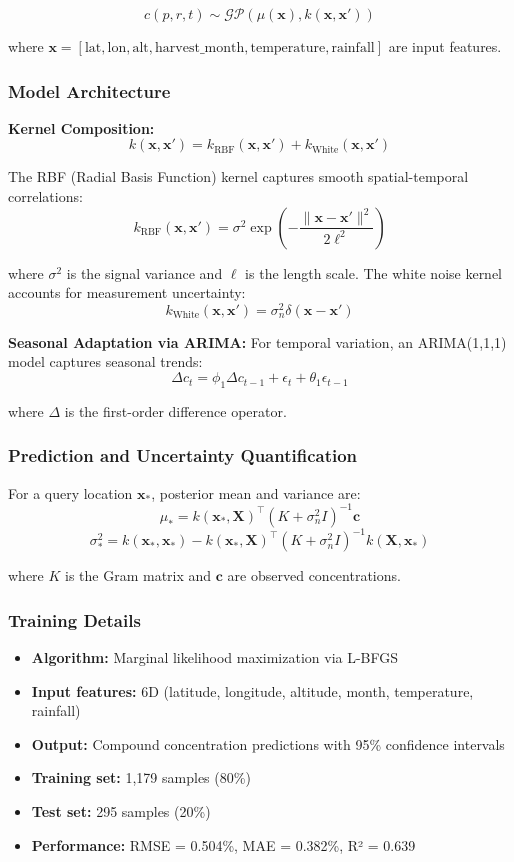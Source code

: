 \documentclass[11pt,a4paper]{article}
\begin{document}
\[
c(p, r, t) \sim \mathcal{GP}(\mu(\mathbf{x}), k(\mathbf{x}, \mathbf{x}'))
\]

where $\mathbf{x} = [\text{lat}, \text{lon}, \text{alt}, \text{harvest\_month}, \text{temperature}, \text{rainfall}]$ are input features.

\subsubsection{Model Architecture}

\textbf{Kernel Composition:}
\[
k(\mathbf{x}, \mathbf{x}') = k_{\text{RBF}}(\mathbf{x}, \mathbf{x}') + k_{\text{White}}(\mathbf{x}, \mathbf{x}')
\]

The RBF (Radial Basis Function) kernel captures smooth spatial-temporal correlations:
\[
k_{\text{RBF}}(\mathbf{x}, \mathbf{x}') = \sigma^2 \exp\left(-\frac{\|\mathbf{x} - \mathbf{x}'\|^2}{2\ell^2}\right)
\]

where $\sigma^2$ is the signal variance and $\ell$ is the length scale. The white noise kernel accounts for measurement uncertainty:
\[
k_{\text{White}}(\mathbf{x}, \mathbf{x}') = \sigma_n^2 \delta(\mathbf{x} - \mathbf{x}')
\]

\textbf{Seasonal Adaptation via ARIMA:}
For temporal variation, an ARIMA(1,1,1) model captures seasonal trends:
\[
\Delta c_t = \phi_1 \Delta c_{t-1} + \epsilon_t + \theta_1 \epsilon_{t-1}
\]

where $\Delta$ is the first-order difference operator.

\subsubsection{Prediction and Uncertainty Quantification}

For a query location $\mathbf{x}_*$, posterior mean and variance are:
\[
\mu_* = k(\mathbf{x}_*, \mathbf{X})^\top (K + \sigma_n^2 I)^{-1} \mathbf{c}
\]
\[
\sigma_*^2 = k(\mathbf{x}_*, \mathbf{x}_*) - k(\mathbf{x}_*, \mathbf{X})^\top (K + \sigma_n^2 I)^{-1} k(\mathbf{X}, \mathbf{x}_*)
\]

where $K$ is the Gram matrix and $\mathbf{c}$ are observed concentrations.

\subsubsection{Training Details}

\begin{itemize}
    \item \textbf{Algorithm:} Marginal likelihood maximization via L-BFGS
    \item \textbf{Input features:} 6D (latitude, longitude, altitude, month, temperature, rainfall)
    \item \textbf{Output:} Compound concentration predictions with 95\% confidence intervals
    \item \textbf{Training set:} 1,179 samples (80\%)
    \item \textbf{Test set:} 295 samples (20\%)
    \item \textbf{Performance:} RMSE = 0.504\%, MAE = 0.382\%, R² = 0.639
\end{itemize}
\end{document}
